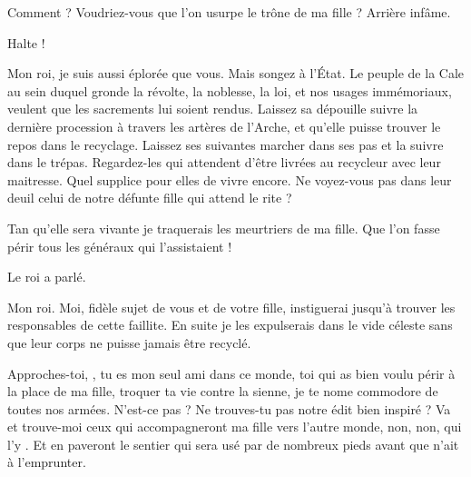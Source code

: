 \begin{drama}
  \roispeaks Comment ? Voudriez-vous que l’on usurpe le trône de ma fille ? Arrière infâme.

  \kingsgardsspeaks {} Halte !

  \reinespeaks Mon roi, je suis aussi éplorée que vous. Mais songez à l’État. Le peuple de la Cale au sein duquel gronde la révolte, la noblesse, la loi, et nos usages immémoriaux, veulent que les sacrements lui soient rendus. Laissez sa dépouille suivre la dernière procession à travers les artères de l’Arche, et qu’elle puisse trouver le repos dans le recyclage. Laissez ses suivantes marcher dans ses pas et la suivre dans le trépas.
  Regardez-les qui attendent d’être livrées au recycleur avec leur maitresse. Quel supplice pour elles de vivre encore. Ne voyez-vous pas dans leur deuil celui de notre défunte fille qui attend le rite ?

  \roispeaks Tan qu’elle sera vivante je traquerais les meurtriers de ma fille. Que l’on fasse périr tous les généraux qui l’assistaient !

  \kingsgardsspeaks Le roi a parlé.

  \generalspeaks Mon roi. Moi, fidèle sujet de vous et de votre fille, instiguerai jusqu’à trouver les responsables de cette faillite. En suite je les expulserais dans le vide céleste sans que leur corps ne puisse jamais être recyclé.

  \roispeaks Approches-toi, \general, tu es mon seul ami dans ce monde,  toi qui as bien voulu périr à la place de ma fille, troquer ta vie contre la sienne, je te nome commodore de toutes nos armées.   N’est-ce pas \princesse ? Ne trouves-tu pas notre édit bien inspiré ?  Va et trouve-moi ceux qui accompagneront ma fille vers l’autre monde, non, non, qui l’y . Et en paveront le sentier qui sera usé par de nombreux pieds avant que \princesse n’ait à l’emprunter.
\end{drama}

\scene


\StageDirII{\elena, \alexas}



